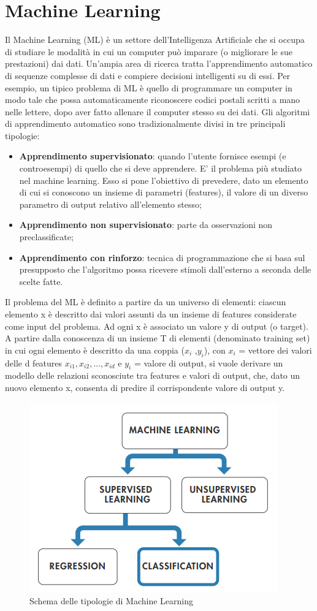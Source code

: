 \section{Machine Learning}
Il Machine Learning (ML) è un settore dell'Intelligenza Artificiale che si occupa di studiare le modalità in cui un computer può imparare (o migliorare le sue prestazioni) dai dati\cite{10}. Un'ampia area di ricerca tratta l'apprendimento automatico di sequenze complesse di dati e compiere decisioni intelligenti su di essi. Per esempio, un tipico problema di ML è quello di programmare un computer in modo tale che possa automaticamente riconoscere codici postali scritti a mano nelle lettere, dopo aver fatto allenare il computer stesso su dei dati.
Gli algoritmi di apprendimento automatico sono tradizionalmente divisi in tre principali tipologie:
\begin{itemize}
	\item \textbf{Apprendimento supervisionato}: quando l'utente fornisce esempi (e controesempi) di quello che si deve apprendere. E' il problema più studiato	nel machine learning. Esso si pone l’obiettivo di prevedere, dato un
	elemento di cui si conoscono un insieme di parametri (features), il valore di un diverso parametro di output relativo all’elemento stesso;
	\item \textbf{Apprendimento non supervisionato}: parte da osservazioni non preclassificate;
	\item \textbf{Apprendimento con rinforzo}: tecnica di programmazione che si basa sul 	presupposto che l'algoritmo possa ricevere stimoli dall'esterno a seconda
	delle scelte fatte.
\end{itemize}
Il problema del ML è definito a partire da un universo di elementi: ciascun elemento x è descritto dai valori assunti da un insieme di features considerate come input del problema. Ad ogni x è associato un valore y di output (o target). A partire dalla conoscenza di un insieme T di elementi (denominato training set) in cui ogni elemento è descritto da una coppia ($x_i$ ,$y_i$), con $x_i$ = vettore dei valori delle d features $x_{i1}, x_{i2}, ... , x_{id}$ e $y_i$ = valore di output, si vuole derivare un modello delle relazioni sconosciute tra features e valori di output, che, dato un nuovo elemento x, consenta di predire il corrispondente valore di output y. 
\begin{figure}[]
	\centering
	\includegraphics[scale=1]{images/Tipologie_Machine_Learning.png}
	\caption{Schema delle tipologie di Machine Learning}
\end{figure}
